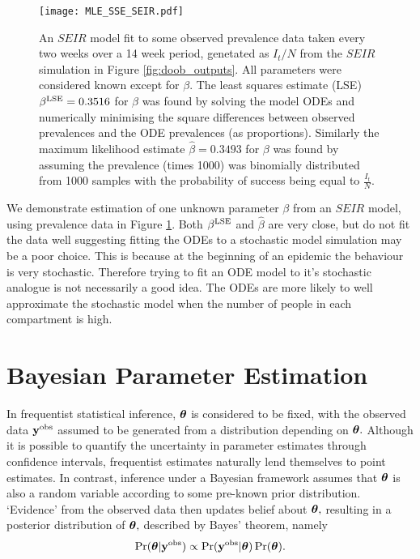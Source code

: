 \begin{figure}[htbp]
    \centering
    \texttt{[image: MLE\_SSE\_SEIR.pdf]}
    \caption{
        An $SEIR$ model fit to some observed prevalence data taken every two
        weeks over a 14 week period, genetated as $I_t/N$ from the $SEIR$
        simulation in Figure \ref{fig:doob_outputs}.
        All parameters were considered known except for $\beta$.
        The least squares estimate (LSE) $\beta^{\mathrm{LSE}} = 0.3516$
        for $\beta$
        was found by solving the model ODEs and numerically minimising the
        square differences between observed prevalences and the ODE prevalences
        (as proportions). Similarly the maximum likelihood estimate
        $\hat{\beta} = 0.3493$ for $\beta$
        was found by assuming the prevalence (times 1000) was binomially
        distributed from 1000 samples with the probability of success being
        equal to $\frac{I_t}{N}.$
    }
    \label{fig:MLE_SSE}
\end{figure}

We demonstrate estimation of one unknown parameter $\beta$ from an $SEIR$ model,
using prevalence data in Figure
\ref{fig:MLE_SSE}. Both $\beta^{\mathrm{LSE}}$ and $\hat{\beta}$ are very close, but do
not fit the data well suggesting fitting the ODEs to a stochastic model
simulation may be a poor choice. This is because at the beginning of an
epidemic the behaviour is very stochastic. Therefore trying to fit an ODE model
to it's stochastic analogue is not necessarily a good idea. The ODEs are more
likely to well approximate the stochastic model when the number of people in
each compartment is high.

\section{Bayesian Parameter Estimation}

In frequentist statistical inference, $\bm{\theta}$ is considered to be
fixed, with the observed data $\mathbf{y}^{\mathrm{obs}}$ assumed to be
generated from a distribution depending on $\bm{\theta}.$ Although it is possible
to quantify the uncertainty in parameter estimates through confidence intervals,
frequentist estimates naturally lend themselves to point estimates.
In contrast, inference under a Bayesian
framework assumes that $\bm{\theta}$ is also a random variable according to some
pre-known prior distribution. `Evidence' from the observed data then updates
belief about
$\bm{\theta},$ resulting in a posterior distribution of $\bm{\theta},$ described by
Bayes' theorem, namely
$$
    \Pr(\bm{\theta}|\mathbf{y}^{\mathrm{obs}}) \propto \Pr(\mathbf{y}^{\mathrm{obs}}|\bm{\theta})\Pr(\bm{\theta}).
$$

